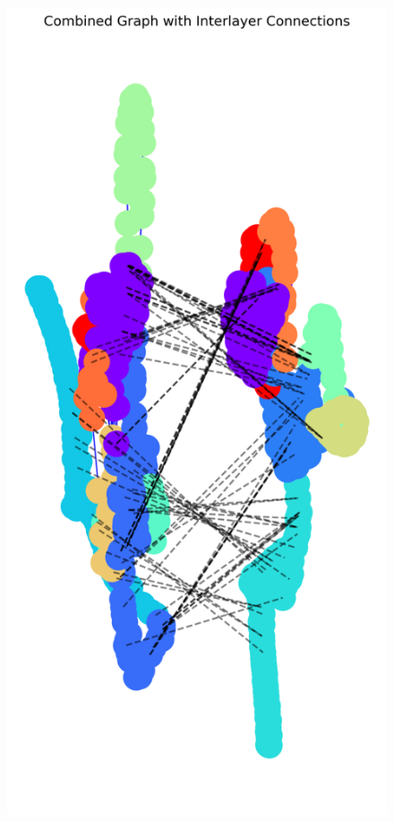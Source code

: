 \documentclass[10pt,letterpaper]{article}
\begin{document}
\begin{figure}[h!]
	\begin{minipage}[b]{0.25\linewidth}
		\centering
		\includegraphics[width=\textwidth]{figs/fig7.png}

\end{minipage}
\end{figure}
\end{document}
